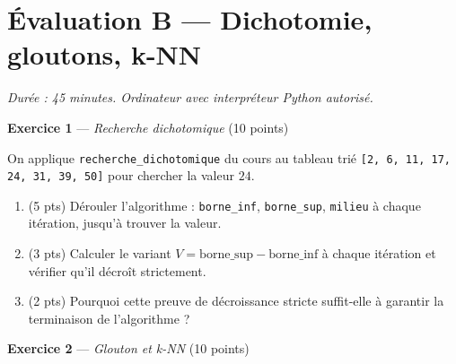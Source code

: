 \section*{Évaluation B --- Dichotomie, gloutons, k-NN}
\textit{Durée : 45 minutes. Ordinateur avec interpréteur Python autorisé.}


\bigskip

\textbf{Exercice 1} --- \textit{Recherche dichotomique} \hfill (10 points)

On applique \lstinline{recherche_dichotomique} du cours au tableau trié
\lstinline{[2, 6, 11, 17, 24, 31, 39, 50]} pour chercher la valeur $24$.

\begin{enumerate}
  \item (5 pts) Dérouler l'algorithme : \lstinline{borne_inf}, \lstinline{borne_sup}, \lstinline{milieu} à chaque itération, jusqu'à trouver la valeur.
  \item (3 pts) Calculer le variant $V=\text{borne\_sup}-\text{borne\_inf}$ à chaque itération et vérifier qu'il décroît strictement.
  \item (2 pts) Pourquoi cette preuve de décroissance stricte suffit-elle à garantir la terminaison de l'algorithme ?
\end{enumerate}


\bigskip

\textbf{Exercice 2} --- \textit{Glouton et k-NN} \hfill (10 points)

